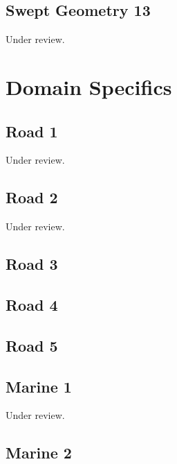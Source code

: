 \documentclass{scrartcl}
\begin{document}
\subsection{Swept Geometry 13} %
\label{sec:swept_13}
Under review.%
\clearpage

\section{Domain Specifics}
\label{sec:domain_specifics}

\subsection{Road 1}  %
\label{sec:road_1}
Under review.%
\clearpage

\subsection{Road 2} %
\label{sec:road_2}
Under review.%
\clearpage

\subsection{Road 3} %
\label{sec:road_3}
\clearpage

\subsection{Road 4} %
\label{sec:road_4}
\clearpage

\subsection{Road 5} %
\label{sec:road_5}
\clearpage

\subsection{Marine 1} %
\label{sec:marine_1}
Under review.%
\clearpage

\subsection{Marine 2} %
\label{sec:marine_2}
\clearpage
\end{document}
